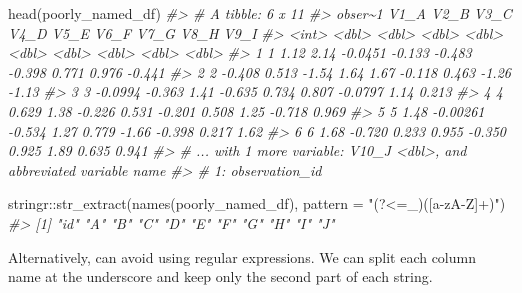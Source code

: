 \documentclass[
  12pt,
]{book}
\newenvironment{Shaded}{\begin{snugshade}}{\end{snugshade}}
\newcommand{\AttributeTok}[1]{\textcolor[rgb]{0.77,0.63,0.00}{#1}}
\newcommand{\CommentTok}[1]{\textcolor[rgb]{0.56,0.35,0.01}{\textit{#1}}}
\newcommand{\FunctionTok}[1]{\textcolor[rgb]{0.00,0.00,0.00}{#1}}
\newcommand{\NormalTok}[1]{#1}
\newcommand{\SpecialCharTok}[1]{\textcolor[rgb]{0.00,0.00,0.00}{#1}}
\newcommand{\StringTok}[1]{\textcolor[rgb]{0.31,0.60,0.02}{#1}}
\begin{document}
\begin{Shaded}
\begin{Highlighting}[]
\FunctionTok{head}\NormalTok{(poorly\_named\_df)}
\CommentTok{\#\textgreater{} \# A tibble: 6 x 11}
\CommentTok{\#\textgreater{}   obser\textasciitilde{}1    V1\_A     V2\_B    V3\_C   V4\_D   V5\_E   V6\_F    V7\_G   V8\_H   V9\_I}
\CommentTok{\#\textgreater{}     \textless{}int\textgreater{}   \textless{}dbl\textgreater{}    \textless{}dbl\textgreater{}   \textless{}dbl\textgreater{}  \textless{}dbl\textgreater{}  \textless{}dbl\textgreater{}  \textless{}dbl\textgreater{}   \textless{}dbl\textgreater{}  \textless{}dbl\textgreater{}  \textless{}dbl\textgreater{}}
\CommentTok{\#\textgreater{} 1       1  1.12    2.14    {-}0.0451 {-}0.133 {-}0.483 {-}0.398  0.771   0.976 {-}0.441}
\CommentTok{\#\textgreater{} 2       2 {-}0.408   0.513   {-}1.54    1.64   1.67  {-}0.118  0.463  {-}1.26  {-}1.13 }
\CommentTok{\#\textgreater{} 3       3 {-}0.0994 {-}0.363    1.41   {-}0.635  0.734  0.807 {-}0.0797  1.14   0.213}
\CommentTok{\#\textgreater{} 4       4  0.629   1.38    {-}0.226   0.531 {-}0.201  0.508  1.25   {-}0.718  0.969}
\CommentTok{\#\textgreater{} 5       5  1.48   {-}0.00261 {-}0.534   1.27   0.779 {-}1.66  {-}0.398   0.217  1.62 }
\CommentTok{\#\textgreater{} 6       6  1.68   {-}0.720    0.233   0.955 {-}0.350  0.925  1.89    0.635  0.941}
\CommentTok{\#\textgreater{} \# ... with 1 more variable: V10\_J \textless{}dbl\textgreater{}, and abbreviated variable name}
\CommentTok{\#\textgreater{} \#   1: observation\_id}
\end{Highlighting}
\end{Shaded}

\begin{Shaded}
\begin{Highlighting}[]
\NormalTok{stringr}\SpecialCharTok{::}\FunctionTok{str\_extract}\NormalTok{(}\FunctionTok{names}\NormalTok{(poorly\_named\_df), }\AttributeTok{pattern =} \StringTok{"(?\textless{}=\_)([a{-}zA{-}Z]+)"}\NormalTok{)}
\CommentTok{\#\textgreater{}  [1] "id" "A"  "B"  "C"  "D"  "E"  "F"  "G"  "H"  "I"  "J"}
\end{Highlighting}
\end{Shaded}

Alternatively, can avoid using regular expressions. We can split each column name at the underscore and keep only the second part of each string.
\end{document}
